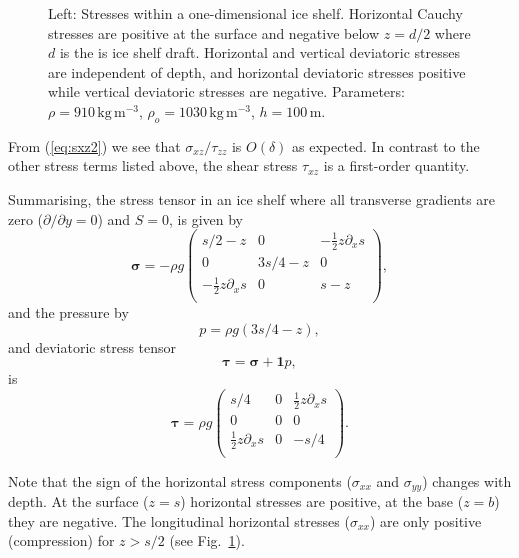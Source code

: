 \documentclass[10pt,a4paper]{book}
\newcommand{\de}{\delta}
\newcommand{\tzz}{\tau_{zz}}
\newcommand{\txz}{\tau_{xz}}
\newcommand{\sxz}{\sigma_{xz}}
\begin{document}
\begin{figure}
\begin{subfigure}{0.5\textwidth}
\end{subfigure}
\caption{\label{fig:stresses}Left: Stresses within a one-dimensional
  ice shelf. Horizontal Cauchy stresses are positive at the surface
  and negative below $z=d/2$ where $d$ is the is ice shelf
  draft. Horizontal and vertical deviatoric stresses are independent
  of depth, and horizontal deviatoric stresses positive while vertical
  deviatoric stresses are negative. Parameters:
  $\rho=910 \, \mathrm{kg\, m^{-3}}$,
  $\rho_o=1030 \, \mathrm{kg \, m^{-3}}$, $h= 100 \, \mathrm{m}$.}
\end{figure}


From (\ref{eq:sxz2}) we see that $\sxz/\tzz$ is $O(\de)$ as
expected. In contrast to the other stress terms listed above, the
shear stress $\txz$ is a first-order quantity.

Summarising, the stress tensor in an ice shelf where all transverse gradients are zero
($\partial/\partial y=0$) and $S=0$, is given by
\begin{equation}
 \bm{\sigma}= -\rho g \left ( \begin{array}{ccc} 
s/2-z & 0  & -\frac{1}{2} z \partial_x s \\
 0  & 3 s/4-z &  0 \\
 -\frac{1}{2} z \partial_x s & 0 & s-z \\ 
 \end{array} \right ),
\label{eq:shelfstresses}
 \end{equation}
and the pressure by
\[ p=\rho g (3 s/4 -z) ,
\]
and deviatoric stress tensor
\[
\bm{\tau}=\bm{\sigma}+ \bm{1} p,
\]
is 
\begin{equation}
 \bm{\tau}= \rho g \left ( \begin{array}{ccc} 
    s/4 & 0  & \frac{1}{2} z \partial_x s \\
 0  & 0 &  0 \\
 \frac{1}{2} z \partial_x s & 0 & -s/4 \\ 
 \end{array} \right ).
\label{eq:shelfdevstresses}
 \end{equation}



 Note that the sign of the horizontal stress components ($\sigma_{xx}$
 and $\sigma_{yy}$) changes with depth. At the surface ($z=s$)
 horizontal stresses are positive, at the base ($z=b$) they are
 negative. The longitudinal horizontal stresses ($\sigma_{xx}$) are
 only positive (compression) for $z>s/2$ (see
 Fig.~\ref{fig:stresses}).
\end{document}

